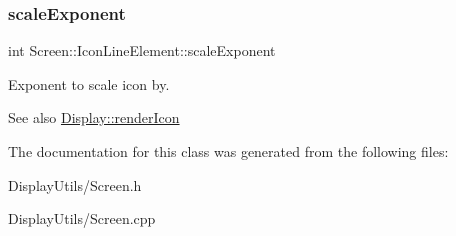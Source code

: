 \subsubsection{\texorpdfstring{scale\+Exponent}{scaleExponent}}
{\footnotesize\ttfamily int Screen\+::\+Icon\+Line\+Element\+::scale\+Exponent\hspace{0.3cm}{\ttfamily [protected]}}



Exponent to scale icon by. 

\begin{DoxySeeAlso}{See also}
\mbox{\hyperlink{classDisplay_a7e1b0ac97b561093e8f1993d7743c095}{Display\+::render\+Icon}} 
\end{DoxySeeAlso}


The documentation for this class was generated from the following files\+:\begin{DoxyCompactItemize}
\item 
Display\+Utils/Screen.\+h\item 
Display\+Utils/Screen.\+cpp\end{DoxyCompactItemize}
